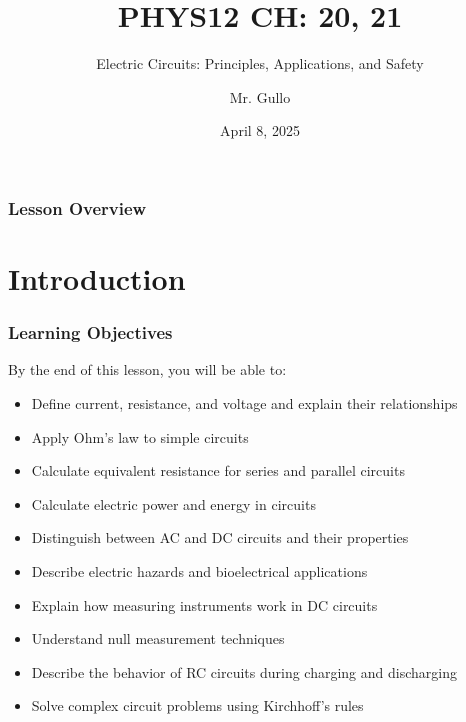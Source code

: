 \documentclass{beamer}
\title[Electric Circuits]{PHYS12 CH: 20, 21}
\subtitle{Electric Circuits: Principles, Applications, and Safety}
\author[Mr. Gullo]{Mr. Gullo}
\date[Apr 2025]{April 8, 2025}
\institute[Physics Dept.]{Physics Department}
\begin{document}
\begin{frame}
    \titlepage
\end{frame}

\begin{frame}
    \frametitle{Lesson Overview}
    \tableofcontents
\end{frame}

\section{Introduction}
\begin{frame}
    \frametitle{Learning Objectives}
    \begin{block}{By the end of this lesson, you will be able to:}
        \begin{itemize}
            \item Define current, resistance, and voltage and explain their relationships
            \item Apply Ohm's law to simple circuits
            \item Calculate equivalent resistance for series and parallel circuits
            \item Calculate electric power and energy in circuits
            \item Distinguish between AC and DC circuits and their properties
            \item Describe electric hazards and bioelectrical applications
            \item Explain how measuring instruments work in DC circuits
            \item Understand null measurement techniques
            \item Describe the behavior of RC circuits during charging and discharging
            \item Solve complex circuit problems using Kirchhoff's rules
        \end{itemize}
    \end{block}
\end{frame}

\end{document}
